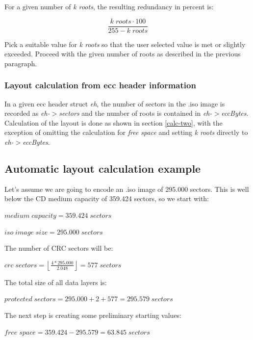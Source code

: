 For a given number of {\em k roots}, the resulting redundancy in percent is:

\[\frac{k\; roots \cdot 100}{255 - k\; roots}\]

Pick a suitable value for {\em k roots} so that the user selected value
is met or slightly exceeded. Proceed with the given number of roots
as described in the previous paragraph.

\subsubsection{Layout calculation from ecc header information}
\label{recalc-layout-header-two}

In a given ecc header struct {\em eh}, the number of sectors in the .iso
image is recorded as \mbox{\em eh-$>$sectors} 
and the number of roots is contained in \mbox{\em eh-$>$eccBytes}.
Calculation of the layout is done as shown in section \ref{calc-two}, 
with the exception of omitting the calculation for {\em free space} and
setting {\em k roots} directly to  \mbox{\em eh-$>$eccBytes}.

\subsection{Automatic layout calculation example}
\label{example-two}

Let's assume we are going to encode an .iso image of 295.000 sectors.
This is well below the CD medium capacity of 359.424 sectors, so we
start with:

\smallskip

$medium\; capacity = 359.424\; sectors$

$iso\; image\; size = 295.000\; sectors$

\medskip

The number of CRC sectors will be:

\smallskip

$crc\; sectors = \left\lfloor\frac{4 * 295.000}{2.048}\right\rfloor = 577\; sectors$

\medskip

The total size of all data layers is:

$protected\; sectors = 295.000 + 2 + 577 = 295.579\; sectors$

\bigskip

The next step is creating some preliminary starting values:

\smallskip

$free\; space = 359.424 - 295.579 = 63.845\; sectors$

